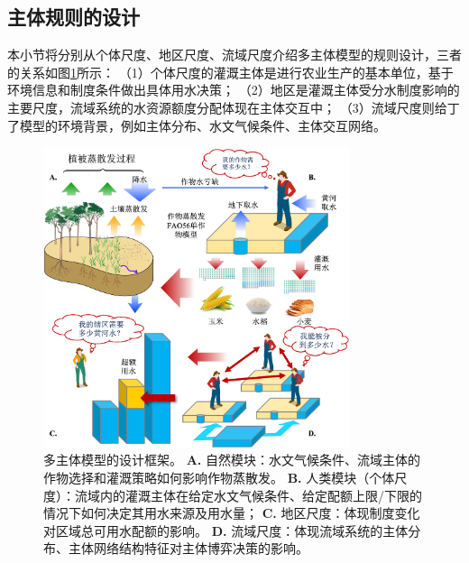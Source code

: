 
\subsection{主体规则的设计}

本小节将分别从个体尺度、地区尺度、流域尺度介绍多主体模型的规则设计，三者的关系如图\ref{ch6:fig:framework}所示：
（1）个体尺度的灌溉主体是进行农业生产的基本单位，基于环境信息和制度条件做出具体用水决策；
（2）地区是灌溉主体受分水制度影响的主要尺度，流域系统的水资源额度分配体现在主体交互中；
（3）流域尺度则给丁了模型的环境背景，例如主体分布、水文气候条件、主体交互网络。

\begin{figure}[htb]
    \centering
    \includegraphics[width=0.8\textwidth]{img/ch6/ch6_framework.png}
    \caption[多主体模型的设计框架]{多主体模型的设计框架。
        \textbf{A.} 自然模块：水文气候条件、流域主体的作物选择和灌溉策略如何影响作物蒸散发。
        \textbf{B.} 人类模块（个体尺度）：流域内的灌溉主体在给定水文气候条件、给定配额上限/下限的情况下如何决定其用水来源及用水量；
        \textbf{C.} 地区尺度：体现制度变化对区域总可用水配额的影响。
        \textbf{D.} 流域尺度：体现流域系统的主体分布、主体网络结构特征对主体博弈决策的影响。
    }\label{ch6:fig:framework}
\end{figure}

